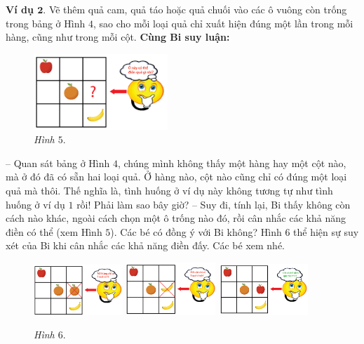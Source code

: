 	\textbf{\color{toancuabi}Ví dụ $\pmb2.$} Vẽ thêm quả cam, quả táo hoặc quả chuối vào các ô vuông còn trống trong bảng ở Hình $4$, sao cho mỗi loại quả chỉ xuất hiện đúng một lần trong mỗi hàng, cũng như trong mỗi cột.
	\vskip 0.1cm
	\textbf{\color{toancuabi}Cùng Bi suy luận:}
	\vskip 0.15cm
	\begin{figure}
		\centering
		\vspace*{-5pt}
		\captionsetup{labelformat= empty, justification=centering}
		\includegraphics[width=0.45\textwidth]{hinh5}
		\caption{\small\textit{Hình $5.$}}
		\vspace*{-5pt}
	\end{figure}
	-- Quan sát bảng ở Hình $4$, chúng mình không thấy một hàng hay một cột nào, mà ở đó đã có sẵn hai loại quả. Ở hàng nào, cột nào cũng chỉ có đúng một loại quả mà thôi. Thế nghĩa là,  tình huống ở ví dụ này không tương tự như tình huống ở ví dụ $1$ rồi! Phải làm sao bây giờ?
	\vskip 0.1cm	
	-- Suy đi, tính lại, Bi thấy không còn cách nào khác, ngoài cách chọn một ô trống nào đó, rồi cân nhắc các khả năng điền có thể (xem Hình $5$). Các bé có đồng ý với Bi không?
	\vskip 0.1cm
	Hình $6$ thể hiện sự suy xét của Bi khi cân nhắc các khả năng điền đấy. Các bé xem nhé.
	\begin{figure}[H]
		\centering
		\vspace*{-5pt}
		\captionsetup{labelformat= empty, justification=centering}
		\includegraphics[width=0.3\textwidth]{hinh6a}\hfill
		\includegraphics[width=0.3\textwidth]{hinh6b}\hfill
		\includegraphics[width=0.3\textwidth]{hinh6c}
		\caption{\small\textit{Hình $6.$}}
		\vspace*{-10pt}
	\end{figure}
